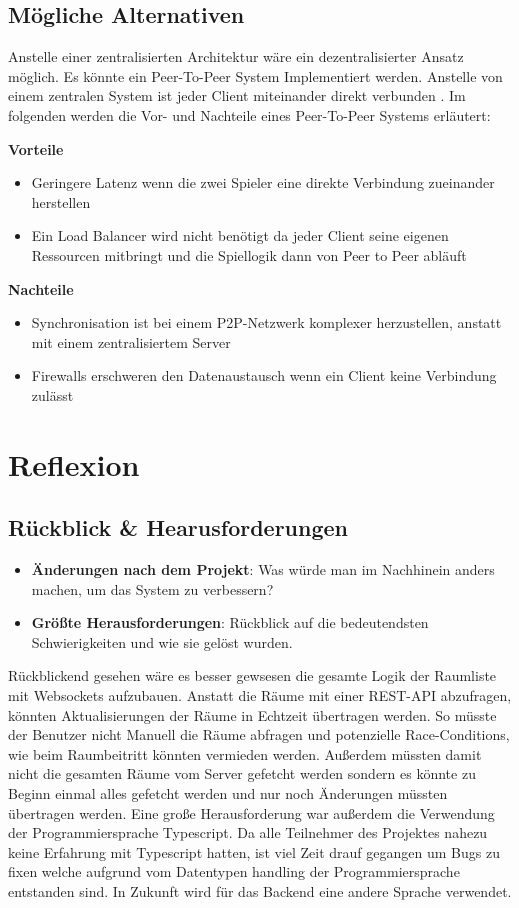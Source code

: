 \documentclass[
]{article}
\begin{document}
\subsection{Mögliche Alternativen}
Anstelle einer zentralisierten Architektur wäre ein dezentralisierter Ansatz möglich. Es könnte ein Peer-To-Peer System Implementiert werden. Anstelle von einem zentralen System ist jeder Client miteinander direkt verbunden \cite{gordon2001distributed}. Im folgenden werden die Vor- und Nachteile eines Peer-To-Peer Systems erläutert:

\textbf{Vorteile}
\begin{itemize}
\item Geringere Latenz wenn die zwei Spieler eine direkte Verbindung zueinander herstellen
\item Ein Load Balancer wird nicht benötigt da jeder Client seine eigenen Ressourcen mitbringt und die Spiellogik dann von Peer to Peer abläuft
\end{itemize}

\textbf{Nachteile}
\begin{itemize}
\item Synchronisation ist bei einem P2P-Netzwerk komplexer herzustellen, anstatt mit einem zentralisiertem Server
\item Firewalls \glqq erschweren\grqq{} den Datenaustausch wenn ein Client keine Verbindung zulässt \cite{gordon2001distributed}
\end{itemize}

\section{Reflexion}

\subsection{Rückblick \& Hearusforderungen}
\begin{itemize}
    \item \textbf{Änderungen nach dem Projekt}: Was würde man im Nachhinein anders machen, um das System zu verbessern?
      \item \textbf{Größte Herausforderungen}: Rückblick auf die bedeutendsten Schwierigkeiten und wie sie gelöst wurden.
\end{itemize}
Rückblickend gesehen wäre es besser gewsesen die gesamte Logik der Raumliste mit Websockets aufzubauen. Anstatt die Räume mit einer REST-API abzufragen, könnten Aktualisierungen der Räume in Echtzeit übertragen werden. So müsste der Benutzer nicht Manuell die Räume abfragen und potenzielle Race-Conditions, wie beim Raumbeitritt könnten vermieden werden. Außerdem müssten damit nicht die gesamten Räume vom Server gefetcht werden sondern es könnte zu Beginn einmal alles gefetcht werden und nur noch Änderungen müssten übertragen werden.   
Eine große Herausforderung war außerdem die Verwendung der Programmiersprache Typescript. Da alle Teilnehmer des Projektes nahezu keine Erfahrung mit Typescript hatten, ist viel Zeit drauf gegangen um Bugs zu fixen welche aufgrund vom Datentypen handling der Programmiersprache entstanden sind. In Zukunft wird für das Backend eine andere Sprache verwendet.
\end{document}
